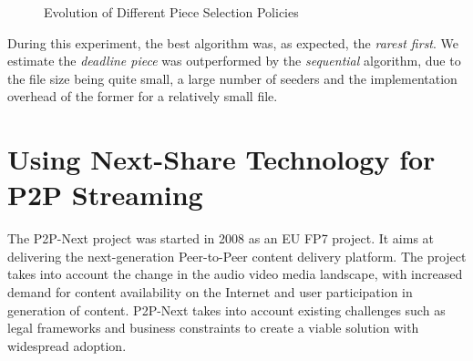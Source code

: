 \begin{figure}
  \centering
  \caption{Evolution of Different Piece Selection Policies}
  \label{fig:multimedia-dist:libtorrent-evolution}
\end{figure}

During this experiment, the best algorithm was, as expected, the
\textit{rarest first}. We estimate the \textit{deadline piece} was
outperformed by the \textit{sequential} algorithm, due to the file size being
quite small, a large number of seeders and the implementation overhead of the
former for a relatively small file.

\section{Using Next-Share Technology for P2P Streaming}
\label{sec:multimedia-dist:nextshare}

The P2P-Next project was started in 2008 as an EU FP7 project. It aims at
delivering the next-generation Peer-to-Peer content delivery platform. The
project takes into account the change in the audio video media landscape, with
increased demand for content availability on the Internet and user participation
in generation of content. P2P-Next takes into account existing challenges such
as legal frameworks and business constraints to create a viable solution with
widespread adoption.

